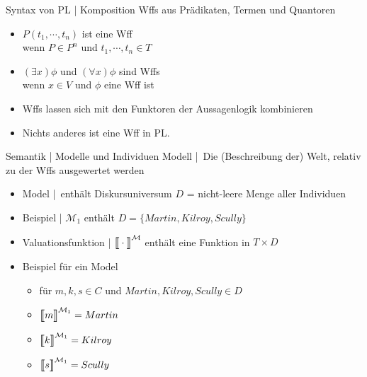 \begin{frame}
  {Syntax von PL | Komposition}
  \onslide<+->
  \onslide<+->
  Wffs aus Prädikaten, Termen und Quantoren\\
  \Halbzeile
  \begin{itemize}[<+->]
    \item \alert{$P(t_1,\cdots,t_n)$} ist eine Wff\\
      wenn \alert{$P\in P^n$} und \alert{$t_1,\cdots,t_n\in T$}
      \Halbzeile
    \item \alert{$(\exists x)\phi$} und \alert{$(\forall x)\phi$} sind Wffs\\
      wenn \alert{$x\in V$} und \alert{$\phi$ eine Wff} ist
      \Halbzeile
    \item Wffs lassen sich mit den Funktoren der Aussagenlogik kombinieren
      \Halbzeile
    \item Nichts anderes ist eine Wff in PL.\\
  \end{itemize}
\end{frame}

\begin{frame}
  {Semantik | Modelle und Individuen}
  \onslide<+->
  \onslide<+->
  \alert{Modell} | Die (Beschreibung der) Welt, relativ zu der Wffs ausgewertet werden\\
  \Halbzeile
  \begin{itemize}[<+->]
    \item \alert{Model} \Model | enthält \alert{Diskursuniversum} $D$ = nicht-leere Menge aller Individuen
    \item Beispiel | ${\mathcal M}_1$ enthält $D=\{Martin,Kilroy,Scully\}$
      \Halbzeile
    \item \alert{Valuationsfunktion} | $\dem{\cdot}^{\Model}$ enthält eine Funktion in $T\times D$
      \Viertelzeile
    \item Beispiel für ein Model \Model{}
      \begin{itemize}[<+->]
        \item für $m,k,s\in C$ und $Martin, Kilroy, Scully\in D$
        \item $\dem{m}^{\Model_1}=Martin$
        \item $\dem{k}^{\Model_1}=Kilroy$
        \item $\dem{s}^{\Model_1}=Scully$
      \end{itemize}
  \end{itemize}
\end{frame}

